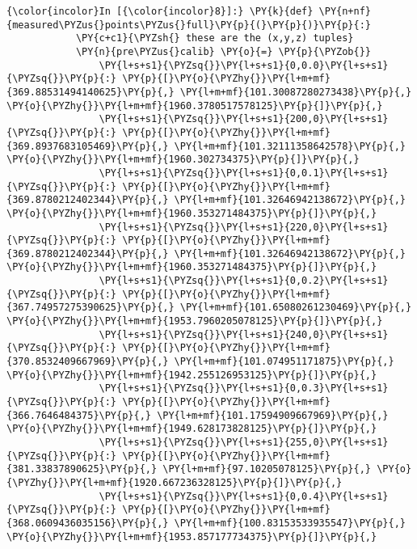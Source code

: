     \begin{Verbatim}[commandchars=\\\{\}]
{\color{incolor}In [{\color{incolor}8}]:} \PY{k}{def} \PY{n+nf}{measured\PYZus{}points\PYZus{}full}\PY{p}{(}\PY{p}{)}\PY{p}{:}
            \PY{c+c1}{\PYZsh{} these are the (x,y,z) tuples}
            \PY{n}{pre\PYZus{}calib} \PY{o}{=} \PY{p}{\PYZob{}}
                \PY{l+s+s1}{\PYZsq{}}\PY{l+s+s1}{0,0.0}\PY{l+s+s1}{\PYZsq{}}\PY{p}{:} \PY{p}{[}\PY{o}{\PYZhy{}}\PY{l+m+mf}{369.88531494140625}\PY{p}{,} \PY{l+m+mf}{101.30087280273438}\PY{p}{,} \PY{o}{\PYZhy{}}\PY{l+m+mf}{1960.3780517578125}\PY{p}{]}\PY{p}{,}
                \PY{l+s+s1}{\PYZsq{}}\PY{l+s+s1}{200,0}\PY{l+s+s1}{\PYZsq{}}\PY{p}{:} \PY{p}{[}\PY{o}{\PYZhy{}}\PY{l+m+mf}{369.8937683105469}\PY{p}{,} \PY{l+m+mf}{101.32111358642578}\PY{p}{,} \PY{o}{\PYZhy{}}\PY{l+m+mf}{1960.302734375}\PY{p}{]}\PY{p}{,}
                \PY{l+s+s1}{\PYZsq{}}\PY{l+s+s1}{0,0.1}\PY{l+s+s1}{\PYZsq{}}\PY{p}{:} \PY{p}{[}\PY{o}{\PYZhy{}}\PY{l+m+mf}{369.8780212402344}\PY{p}{,} \PY{l+m+mf}{101.32646942138672}\PY{p}{,} \PY{o}{\PYZhy{}}\PY{l+m+mf}{1960.353271484375}\PY{p}{]}\PY{p}{,}
                \PY{l+s+s1}{\PYZsq{}}\PY{l+s+s1}{220,0}\PY{l+s+s1}{\PYZsq{}}\PY{p}{:} \PY{p}{[}\PY{o}{\PYZhy{}}\PY{l+m+mf}{369.8780212402344}\PY{p}{,} \PY{l+m+mf}{101.32646942138672}\PY{p}{,} \PY{o}{\PYZhy{}}\PY{l+m+mf}{1960.353271484375}\PY{p}{]}\PY{p}{,}
                \PY{l+s+s1}{\PYZsq{}}\PY{l+s+s1}{0,0.2}\PY{l+s+s1}{\PYZsq{}}\PY{p}{:} \PY{p}{[}\PY{o}{\PYZhy{}}\PY{l+m+mf}{367.74957275390625}\PY{p}{,} \PY{l+m+mf}{101.65080261230469}\PY{p}{,} \PY{o}{\PYZhy{}}\PY{l+m+mf}{1953.7960205078125}\PY{p}{]}\PY{p}{,}
                \PY{l+s+s1}{\PYZsq{}}\PY{l+s+s1}{240,0}\PY{l+s+s1}{\PYZsq{}}\PY{p}{:} \PY{p}{[}\PY{o}{\PYZhy{}}\PY{l+m+mf}{370.8532409667969}\PY{p}{,} \PY{l+m+mf}{101.074951171875}\PY{p}{,} \PY{o}{\PYZhy{}}\PY{l+m+mf}{1942.255126953125}\PY{p}{]}\PY{p}{,}
                \PY{l+s+s1}{\PYZsq{}}\PY{l+s+s1}{0,0.3}\PY{l+s+s1}{\PYZsq{}}\PY{p}{:} \PY{p}{[}\PY{o}{\PYZhy{}}\PY{l+m+mf}{366.7646484375}\PY{p}{,} \PY{l+m+mf}{101.17594909667969}\PY{p}{,} \PY{o}{\PYZhy{}}\PY{l+m+mf}{1949.628173828125}\PY{p}{]}\PY{p}{,}
                \PY{l+s+s1}{\PYZsq{}}\PY{l+s+s1}{255,0}\PY{l+s+s1}{\PYZsq{}}\PY{p}{:} \PY{p}{[}\PY{o}{\PYZhy{}}\PY{l+m+mf}{381.33837890625}\PY{p}{,} \PY{l+m+mf}{97.10205078125}\PY{p}{,} \PY{o}{\PYZhy{}}\PY{l+m+mf}{1920.667236328125}\PY{p}{]}\PY{p}{,}
                \PY{l+s+s1}{\PYZsq{}}\PY{l+s+s1}{0,0.4}\PY{l+s+s1}{\PYZsq{}}\PY{p}{:} \PY{p}{[}\PY{o}{\PYZhy{}}\PY{l+m+mf}{368.0609436035156}\PY{p}{,} \PY{l+m+mf}{100.83153533935547}\PY{p}{,} \PY{o}{\PYZhy{}}\PY{l+m+mf}{1953.857177734375}\PY{p}{]}\PY{p}{,}

\end{Verbatim}

